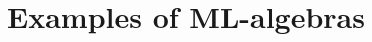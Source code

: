 \documentclass[12pt,reqno]{amsart}
\newcommand{\ednote}[1]{[\textit{\color{red}{#1}}]} %
\newcommand{\CC}{\ensuremath{\mathcal{C}}}
\renewcommand{\to}{\ensuremath{\rightarrow}}
\newcommand{\I}{\ensuremath{\mathrm{I}}}
\renewcommand{\t}{\ensuremath{\mathsf{u}}}
\newcommand{\T}{\ensuremath{\mathsf{U}}}
\newcommand{\TT}{\ensuremath{\dot{\mathsf{U}}}}
\newcommand{\tT}{\ensuremath{{\t}:\TT\to\T}}
\theoremstyle{remark}
\theoremstyle{definition}
\begin{document}
%
%
\section{Examples of ML-algebras}\label{sec:ExamplesML-Algebras}
\end{document}
